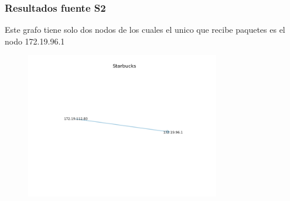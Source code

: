 \subsubsection*{Resultados fuente S2}

Este grafo tiene solo dos nodos de los cuales el unico que recibe paquetes es el nodo 172.19.96.1

\begin{figure}[H]
 \centering
	\includegraphics[width=8.5cm]{figs/starbucks.png}
	\caption{}
	\label{fig:domicilio-grafo}
\end{figure}
